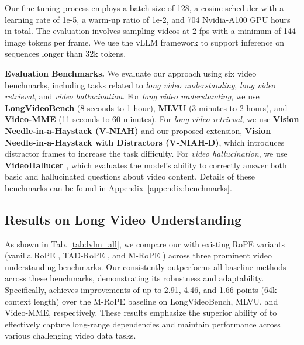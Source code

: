 Our fine-tuning process employs a batch size of 128, a cosine scheduler with a learning rate of 1e-5, a warm-up ratio of 1e-2, and 704 Nvidia-A100 GPU hours in total.
The evaluation involves sampling videos at 2 fps with a minimum of 144 image tokens per frame.
We use the vLLM framework \cite{kwon2023efficient} to support inference on sequences longer than 32k tokens.

\noindent \textbf{Evaluation Benchmarks.} We evaluate our approach using six video benchmarks, including tasks related to \textit{long video understanding}, \textit{long video retrieval}, and \textit{video hallucination}. For \textit{long video understanding}, we use \textbf{LongVideoBench} \cite{wu2024longvideobench} (8 seconds to 1 hour), \textbf{MLVU} \cite{zhou2024mlvu} (3 minutes to 2 hours), and \textbf{Video-MME} \cite{fu2024video} (11 seconds to 60 minutes). For \textit{long video retrieval}, we use \textbf{Vision Needle-in-a-Haystack (V-NIAH)} \cite{zhang2024longva} and our proposed extension, \textbf{Vision Needle-in-a-Haystack with Distractors (V-NIAH-D)}, which introduces distractor frames to increase the task difficulty. For \textit{video hallucination}, we use \textbf{VideoHallucer} \cite{videohallucer}, which evaluates the model's ability to correctly answer both basic and hallucinated questions about video content. Details of these benchmarks can be found in  Appendix~\ref{appendix:benchmarks}.

\subsection{Results on Long Video Understanding}
As shown in Tab. \ref{tab:lvlm_all}, we compare our \methodname with existing RoPE variants (vanilla RoPE \cite{su2024roformer}, TAD-RoPE \cite{gao2024tc}, and M-RoPE \cite{wang2024qwen2}) across three prominent video understanding benchmarks. Our \methodname consistently outperforms all baseline methods across these benchmarks, demonstrating its robustness and adaptability. Specifically, \methodname achieves improvements of up to 2.91, 4.46, and 1.66 points (64k context length) over the M-RoPE baseline on LongVideoBench, MLVU, and Video-MME, respectively. These results emphasize the superior ability of \methodname to effectively capture long-range dependencies and maintain performance across various challenging video data tasks.

